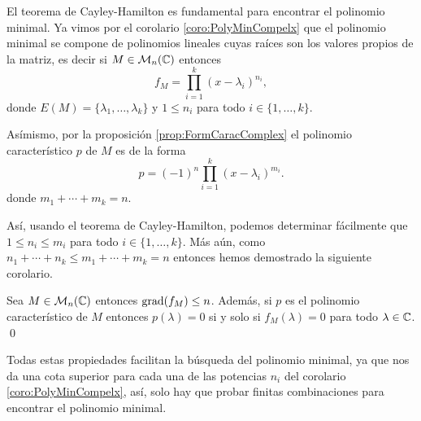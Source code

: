 El teorema de Cayley-Hamilton es fundamental para encontrar el polinomio minimal. Ya vimos por el corolario \ref{coro:PolyMinCompelx} que el polinomio minimal se compone de polinomios lineales cuyas raíces son los valores propios de la matriz, es decir si $M \in \mathcal{M}_n(\mathbb{C})$ entonces
\[
  f_M = \prod_{i=1}^k (x-\lambda_i)^{n_i},
\]
donde $E(M) = \{\lambda_1,\ldots,\lambda_k\}$ y $1 \leq n_i$ para todo $i\in\{1,\ldots,k\}$.

Asímismo, por la proposición \ref{prop:FormCaracComplex} el polinomio característico $p$ de $M$ es de la forma
\[
  p = (-1)^n \prod_{i=1}^k (x-\lambda_i)^{m_i}.
\]
donde $m_1 + \cdots + m_k = n$.

Así, usando el teorema de Cayley-Hamilton, podemos determinar fácilmente que $1 \leq  n_i \leq m_i$ para todo $i\in\{1,\ldots,k\}$. Más aún, como $n_1 + \cdots + n_k \leq m_1 + \cdots + m_k = n$ entonces hemos demostrado la siguiente corolario.

\begin{coro}
  Sea $M \in \mathcal{M}_n(\mathbb{C})$ entonces $\operatorname{grad}(f_M) \leq n$. Además, si $p$ es el polinomio característico de $M$ entonces $p(\lambda) = 0$ si y solo si $f_M(\lambda) = 0$ para todo $\lambda \in \mathbb{C}$. \qed
\end{coro}

Todas estas propiedades facilitan la búsqueda del polinomio minimal, ya que nos da una cota superior para cada una de las potencias $n_i$ del corolario \ref{coro:PolyMinCompelx}, así, solo hay que probar finitas combinaciones para encontrar el polinomio minimal.

